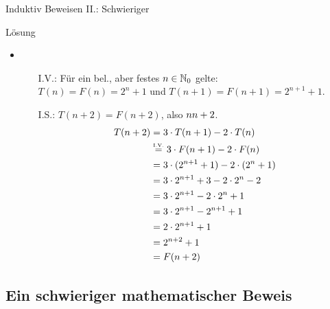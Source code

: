 \begin{frame}{Induktiv Beweisen II.: Schwieriger}
	\begin{block}{Lösung}
	\begin{itemize}
		\item 
		\begin{itemize}
				\item[I.V.:] Für ein bel., aber festes $n \in \mathbb{N}_0$ gelte: \\
				 $T(n)=F(n)=2^n+1$ und $T(n+1)=F(n+1)=2^{n+1}+1$.
				\item[I.S.:] \zz $T(n+2) = F(n+2)$, also $n \notStephan{\leadsto} \Stephan{\curvearrowright} n+2$.
				\begin{align*}
					T(n+2) &= 3 \cdot T(n+1) - 2 \cdot T(n) \\
						   &\eqtext{I.V.} 3 \cdot F(n+1) - 2 \cdot F(n) \\
						   &= 3 \cdot (2^{n+1}+1) - 2 \cdot (2^n+1) \\
						   &= 3 \cdot 2^{n+1} + 3 - 2 \cdot 2^n - 2 \\
						   &= 3 \cdot 2^{n+1} - 2 \cdot 2^n + 1 \\
						   &= 3 \cdot 2^{n+1} - 2^{n+1} +1 \\
						   &= 2 \cdot 2^{n+1} + 1 \\
						   &= 2^{n+2} + 1 \\
						   &=F(n+2)
				\end{align*}
			\end{itemize}
	\end{itemize}
	\end{block}
\end{frame}
\subsection{Ein schwieriger mathematischer Beweis}

